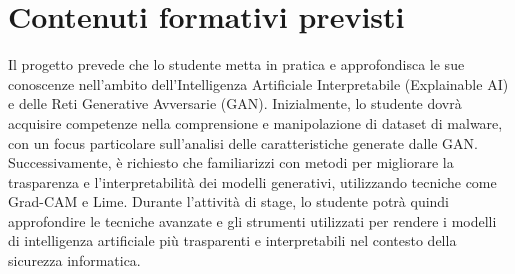 \section*{Contenuti formativi previsti}
Il progetto prevede che lo studente metta in pratica e approfondisca le sue conoscenze nell'ambito dell'Intelligenza Artificiale Interpretabile (Explainable AI) e delle Reti Generative Avversarie (GAN). Inizialmente, lo studente dovrà acquisire competenze nella comprensione e manipolazione di dataset di malware, con un focus particolare sull'analisi delle caratteristiche generate dalle GAN. Successivamente, è richiesto che familiarizzi con metodi per migliorare la trasparenza e l'interpretabilità dei modelli generativi, utilizzando tecniche come Grad-CAM e Lime. Durante l'attività di stage, lo studente potrà quindi approfondire le tecniche avanzate e gli strumenti utilizzati per rendere i modelli di intelligenza artificiale più trasparenti e interpretabili nel contesto della sicurezza informatica.
\newpage